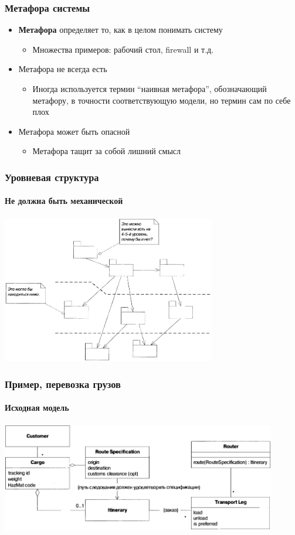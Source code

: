 \documentclass[xetex,mathserif,serif]{beamer}
\begin{document}
	\begin{frame}
		\frametitle{Метафора системы}
		\begin{itemize}
			\item \textbf{Метафора} определяет то, как в целом понимать систему
			\begin{itemize}
				\item Множества примеров: рабочий стол, firewall и т.д.
			\end{itemize}
			\item Метафора не всегда есть
			\begin{itemize}
				\item Иногда используется термин ``наивная метафора'', обозначающий метафору, в точности соответствующую модели, но термин сам по себе плох
			\end{itemize}
			\item Метафора может быть опасной
			\begin{itemize}
				\item Метафора тащит за собой лишний смысл
			\end{itemize}
		\end{itemize}
	\end{frame}

	\begin{frame}
		\frametitle{Уровневая структура}
		\framesubtitle{Не должна быть механической}
		\begin{center}
			\includegraphics[width=0.7\textwidth]{meaninglessLayers.png}
		\end{center}
	\end{frame}

	\begin{frame}
		\frametitle{Пример, перевозка грузов}
		\framesubtitle{Исходная модель}
		\begin{center}
			\includegraphics[width=0.9\textwidth]{cargoNonLayered.png}
		\end{center}
	\end{frame}
\end{document}

